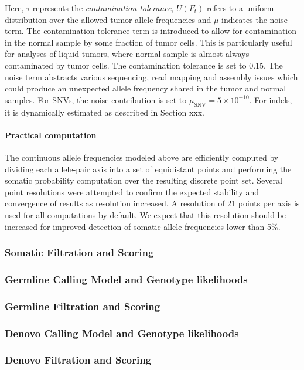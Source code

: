 \documentclass{article}
\begin{document}
\noindent Here, $\tau$ represents the {\em contamination tolerance}, $U(F_t)$ refers to a uniform distribution over the allowed tumor allele frequencies and $\mu$ indicates the noise term. The contamination tolerance term is introduced to allow for contamination in the normal sample by some fraction of tumor cells. This is particularly useful for analyses of liquid tumors, where normal sample is almost always contaminated by tumor cells. The contamination tolerance is set to $0.15$. The noise term abstracts various sequencing, read mapping and assembly issues which could produce an unexpected allele frequency shared in the tumor and normal samples. For SNVs, the noise contribution is set to $\mu_{\text{SNV}} = 5 \times 10^{-10}$. For indels, it is dynamically estimated as described in Section xxx.


\paragraph{Practical computation}
The continuous allele frequencies modeled above are efficiently computed by dividing each allele-pair axis into a set of equidistant points and performing the somatic probability computation over the resulting discrete point set. Several point resolutions were attempted to confirm the expected stability and convergence of results as resolution increased. A resolution of 21 points per axis is used for all computations by default. We expect that this resolution should be increased for improved detection of somatic allele frequencies lower than 5\%.

\subsubsection{Somatic Filtration and Scoring}

\subsubsection{Germline Calling Model and Genotype likelihoods}

\subsubsection{Germline Filtration and Scoring}

\subsubsection{Denovo Calling Model and Genotype likelihoods}

\subsubsection{Denovo Filtration and Scoring}




\end{document}
